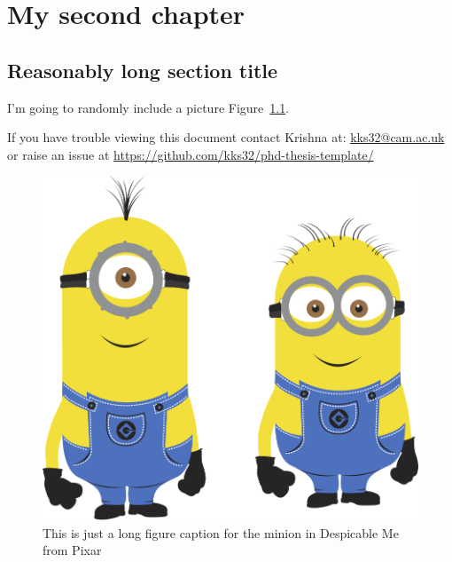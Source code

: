 
\chapter{My second chapter}

\ifpdf
    \graphicspath{{Chapter2/Figs/Raster/}{Chapter2/Figs/PDF/}{Chapter2/Figs/}}
\else
    \graphicspath{{Chapter2/Figs/Vector/}{Chapter2/Figs/}}
\fi


\section[Short title]{Reasonably long section title}

I'm going to randomly include a picture Figure~\ref{fig:minion}.

If you have trouble viewing this document contact Krishna at: \href{mailto:kks32@cam.ac.uk}{kks32@cam.ac.uk} or raise an issue at \url{https://github.com/kks32/phd-thesis-template/}


\begin{figure}[htbp!] 
\centering    
\includegraphics[width=1.0\textwidth]{minion}
\caption[Minion]{This is just a long figure caption for the minion in Despicable Me from Pixar}
\label{fig:minion}
\end{figure}


